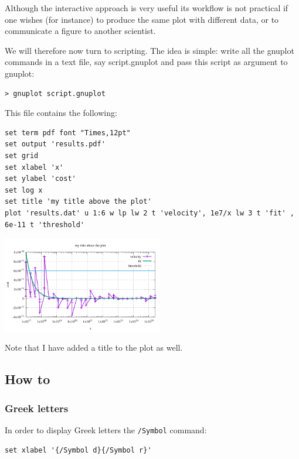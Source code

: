 Although the interactive approach is very useful its workflow 
is not practical if one wishes (for instance) to produce the same plot 
with different data, or to communicate a figure to another scientist. 

We will therefore now turn to scripting. The idea is simple: 
write all the gnuplot commands in a text file, say {\filenamefont script.gnuplot} 
and pass this script as argument to gnuplot:
\begin{mdframed}[backgroundcolor=gray!10]
\begin{verbatim}
> gnuplot script.gnuplot 
\end{verbatim}
\end{mdframed}
This file contains the following:
\begin{verbatim}
set term pdf font "Times,12pt"
set output 'results.pdf'
set grid
set xlabel 'x'
set ylabel 'cost'
set log x
set title 'my title above the plot'
plot 'results.dat' u 1:6 w lp lw 2 t 'velocity', 1e7/x lw 3 t 'fit' , 6e-11 t 'threshold'
\end{verbatim}

\begin{center}
\includegraphics[width=7cm]{images/gnuplot/results.pdf}
\end{center}
Note that I have added a title to the plot as well. 




\subsection*{How to}


\subsubsection*{Greek letters}

In order to display Greek letters the {\tt /Symbol} command:

\begin{verbatim}
set xlabel '{/Symbol d}{/Symbol r}' 
\end{verbatim}

